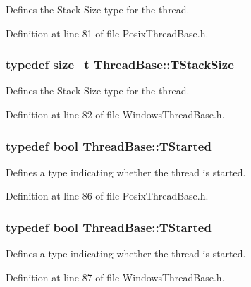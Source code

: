 Defines the Stack Size type for the thread. 



Definition at line 81 of file Posix\-Thread\-Base.\-h.

\hypertarget{class_thread_base_af45bd74387b409e15989f7eddbaf3718}{
\subsubsection[{T\-Stack\-Size}]{\setlength{\rightskip}{0pt plus 5cm}typedef size\-\_\-t {\bf Thread\-Base\-::\-T\-Stack\-Size}}}\label{class_thread_base_af45bd74387b409e15989f7eddbaf3718}


Defines the Stack Size type for the thread. 



Definition at line 82 of file Windows\-Thread\-Base.\-h.

\hypertarget{class_thread_base_ad8b410e3bc7320addea3c5b56ff6c985}{
\subsubsection[{T\-Started}]{\setlength{\rightskip}{0pt plus 5cm}typedef bool {\bf Thread\-Base\-::\-T\-Started}}}\label{class_thread_base_ad8b410e3bc7320addea3c5b56ff6c985}


Defines a type indicating whether the thread is started. 



Definition at line 86 of file Posix\-Thread\-Base.\-h.

\hypertarget{class_thread_base_ad8b410e3bc7320addea3c5b56ff6c985}{
\subsubsection[{T\-Started}]{\setlength{\rightskip}{0pt plus 5cm}typedef bool {\bf Thread\-Base\-::\-T\-Started}}}\label{class_thread_base_ad8b410e3bc7320addea3c5b56ff6c985}


Defines a type indicating whether the thread is started. 



Definition at line 87 of file Windows\-Thread\-Base.\-h.

